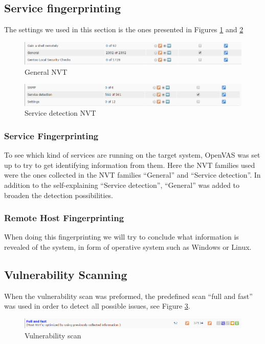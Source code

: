 \newpage

\subsection{Service fingerprinting}
\label{sub:finger_set}
The settings we used in this section is the ones presented in Figures \ref{fig:general} and \ref{fig:service}

\begin{figure}[b!]
  \centering
  \includegraphics[scale=.4]{figures/general_nvt}
  \caption{General NVT} \label{fig:general}
\end{figure}

\begin{figure}[b!]
  \centering
  \includegraphics[scale=.4]{figures/service_nvt}
  \caption{Service detection NVT} \label{fig:service}
\end{figure}

\subsubsection{Service Fingerprinting}
To see which kind of services are running on the target system, OpenVAS was set up to try to get identifying information from them. Here the NVT families used were the ones collected in the NVT families “General” and “Service detection”. In addition to the self-explaining “Service detection”, “General” was added to broaden the detection possibilities.

\subsubsection{Remote Host Fingerprinting}
When doing this fingerprinting we will try to conclude what information is revealed of the system, in form of operative system such as Windows or Linux. 


\subsection{Vulnerability Scanning}
When the vulnerability scan was preformed, the predefined scan “full and fast” was used in order to detect all possible issues, see Figure \ref{fig:vulner}.

\begin{figure}[htb]
  \centering
  \includegraphics[scale=.4]{figures/full_fast}
  \caption{Vulnerability scan} \label{fig:vulner}
\end{figure}

